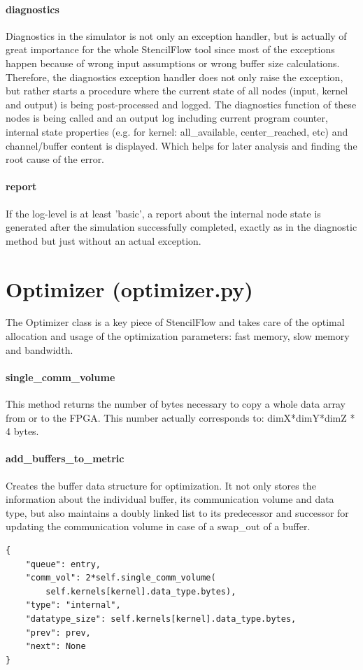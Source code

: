 \paragraph{diagnostics}
Diagnostics in the simulator is not only an exception handler, but is actually of great importance for the whole StencilFlow tool since most of the exceptions happen because of wrong input assumptions or wrong buffer size calculations.\\
Therefore, the diagnostics exception handler does not only raise the exception, but rather starts a procedure where the current state of all nodes (input, kernel and output) is being post-processed and logged. The diagnostics function of these nodes is being called and an output log including current program counter, internal state properties (e.g. for kernel: all\_available, center\_reached, etc) and channel/buffer content is displayed. Which helps for later analysis and finding the root cause of the error.


\paragraph{report}
If the log-level is at least 'basic', a report about the internal node state is generated after the simulation successfully completed, exactly as in the diagnostic method but just without an actual exception.






\section{Optimizer (optimizer.py)}
The Optimizer class is a key piece of StencilFlow and takes care of the optimal allocation and usage of the optimization parameters: fast memory, slow memory and bandwidth. 



\paragraph{single\_comm\_volume}
This method returns the number of bytes necessary to copy a whole data array from or to the FPGA. This number actually corresponds to: dimX*dimY*dimZ * 4 bytes.


\paragraph{add\_buffers\_to\_metric}
Creates the buffer data structure for optimization. It not only stores the information about the individual buffer, its communication volume and data type, but also maintains a doubly linked list to its predecessor and successor for updating the communication volume in case of a swap\_out of a buffer.
\begin{verbatim}
{
    "queue": entry,
    "comm_vol": 2*self.single_comm_volume(
        self.kernels[kernel].data_type.bytes),
    "type": "internal",
    "datatype_size": self.kernels[kernel].data_type.bytes,
    "prev": prev,
    "next": None
}
\end{verbatim}


